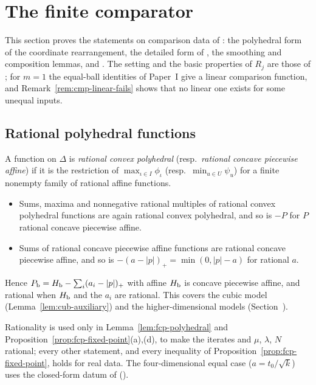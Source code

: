 \section{The finite comparator}\label{sec:fcp}

This section proves the statements on comparison data of : the polyhedral form of the
coordinate rearrangement, the detailed form of , the smoothing and composition
lemmas, and . The setting and the basic properties of $R_j$ are those of
; for $m=1$ the equal-ball identities of Paper~I give a linear comparison function, and
Remark~\ref{rem:cmp-linear-fails} shows that no linear one exists for some unequal inputs.

\subsection{Rational polyhedral functions}\label{sec:fcp-rational}

A function on $\Delta$ is \emph{rational convex polyhedral} (resp.\ \emph{rational concave piecewise affine}) if it is the restriction of $\max_{\iota\in I}\phi_\iota$ (resp.\ $\min_{u\in U}\psi_u$) for a finite nonempty family of rational affine functions.
\begin{itemize}
\item Sums, maxima and nonnegative rational multiples of rational convex polyhedral functions are again rational convex polyhedral, and so is $-P$ for $P$ rational concave piecewise affine.
\item Sums of rational concave piecewise affine functions are rational concave piecewise affine, and so is $-(a-|p|)_+=\min(0,|p|-a)$ for rational $a$.
\end{itemize}

Hence $P_{\mathrm b}=H_{\mathrm b}-\sum_i(a_i-|p|)_+$ with affine $H_{\mathrm b}$ is concave piecewise affine, and rational when $H_{\mathrm b}$ and the $a_i$ are rational. This covers the cubic model (Lemma~\ref{lem:cub-auxiliary}) and the higher-dimensional models (Section~).

Rationality is used only in Lemma~\ref{lem:fcp-polyhedral} and Proposition~\ref{prop:fcp-fixed-point}(a),(d), to make the iterates and $\mu$, $\lambda$, $N$ rational; every other statement, and every inequality of Proposition~\ref{prop:fcp-fixed-point}, holds for real data. The four-dimensional equal case ($a=t_0/\sqrt k$) uses the closed-form datum of  ().

